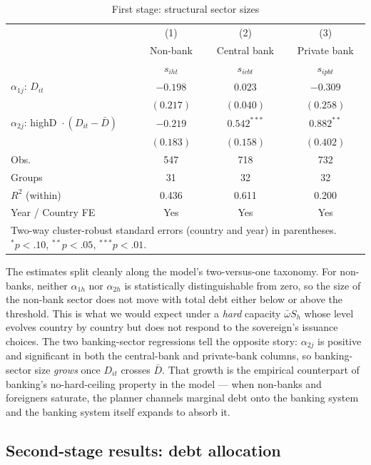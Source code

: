 \documentclass[\latexroot/\projectname]{subfiles}
\begin{document}
\begin{table}[htbp]\centering
\caption{First stage: structural sector sizes}
\label{tab:stage1}
\begin{tabular}{lccc}
\toprule
 & (1) & (2) & (3) \\
 & Non-bank & Central bank & Private bank \\
 & $s_{iht}$ & $s_{icbt}$ & $s_{ipbt}$ \\
\midrule
$\alpha_{1j}$: $D_{it}$
  & $-0.198$ & $0.023$ & $-0.309$ \\
  & $(0.217)$ & $(0.040)$ & $(0.258)$ \\
$\alpha_{2j}$: highD $\!\cdot\!(D_{it}-\bar D)$
  & $-0.219$ & $0.542^{***}$ & $0.882^{**}$ \\
  & $(0.183)$ & $(0.158)$ & $(0.402)$ \\
\midrule
Obs.            & 547 & 718 & 732 \\
Groups          & 31 & 32 & 32 \\
$R^2$ (within)  & 0.436 & 0.611 & 0.200 \\
Year / Country FE & Yes & Yes & Yes \\
\bottomrule
\multicolumn{4}{p{0.85\linewidth}}{\footnotesize Two-way cluster-robust standard errors (country and year) in parentheses. $^{*}p<.10$, $^{**}p<.05$, $^{***}p<.01$.}
\end{tabular}
\end{table}

The estimates split cleanly along the model's two-versus-one
taxonomy. For non-banks, neither $\alpha_{1h}$ nor $\alpha_{2h}$ is
statistically distinguishable from zero, so the size of the non-bank
sector does not move with total debt either below or above the
threshold. This is what we would expect under a \emph{hard} capacity
$\bar\omega S_h$ whose level evolves country by country but does not
respond to the sovereign's issuance choices. The two banking-sector
regressions tell the opposite story: $\alpha_{2j}$ is positive and
significant in both the central-bank and private-bank columns, so
banking-sector size \emph{grows} once $D_{it}$ crosses $\bar D$. That
growth is the empirical counterpart of banking's no-hard-ceiling
property in the model --- when non-banks and foreigners saturate, the
planner channels marginal debt onto the banking system and the
banking system itself expands to absorb it.

\subsection{Second-stage results: debt allocation}
\end{document}
